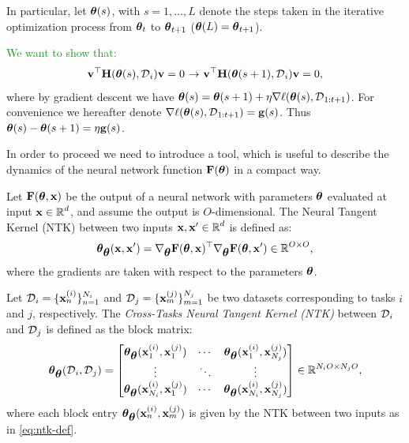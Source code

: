 \documentclass{article} %
\newcommand{\hessian}{\vH}
\begin{document}
In particular, let $\mbox{$\mbox{$\boldsymbol{\theta}$}$}(s)$, with $s=1,\dots,L$ denote the steps taken in the iterative optimization process from $\mbox{$\mbox{$\boldsymbol{\theta}$}$}_{t}$ to $\mbox{$\mbox{$\boldsymbol{\theta}$}$}_{t+1}$ ($\mbox{$\mbox{$\boldsymbol{\theta}$}$}(L) = \mbox{$\mbox{$\boldsymbol{\theta}$}$}_{t+1}$).

\textcolor{forestgreen}{We want to show that:}
\begin{equation}
    \vv^\top \hessian(\vparam(s), \data_i) \vv = 0 \,\,\ra \,\,\vv^\top \hessian(\vparam(s+1), \data_i) \vv = 0,
\end{equation}
where by gradient descent we have $\mbox{$\mbox{$\boldsymbol{\theta}$}$}(s) = \mbox{$\mbox{$\boldsymbol{\theta}$}$}(s+1) + \eta\nabla{\ell({\mbox{$\mbox{$\boldsymbol{\theta}$}$}(s), \mbox{${\cal D}$}_{1:t+1}})}$. For convenience we hereafter denote $\nabla{\ell({\mbox{$\mbox{$\boldsymbol{\theta}$}$}(s), \mbox{${\cal D}$}_{1:t+1}})}  = \mbox{$\mbox{$\mathbf{g}$}$}(s)$. Thus $\mbox{$\mbox{$\boldsymbol{\theta}$}$}(s) - \mbox{$\mbox{$\boldsymbol{\theta}$}$}(s+1) = \eta\mbox{$\mbox{$\mathbf{g}$}$}(s)$.

In order to proceed we need to introduce a tool, which is useful to describe the dynamics of the neural network function $\mbox{$\mbox{$\mathbf{F}$}$}(\mbox{$\mbox{$\boldsymbol{\theta}$}$})$ in a compact way. 

\begin{defn} 
Let $\mbox{$\mbox{$\mathbf{F}$}$}(\mbox{$\mbox{$\boldsymbol{\theta}$}$}, \mbox{$\mbox{$\mathbf{x}$}$})$ be the output of a neural network with parameters $\mbox{$\mbox{$\boldsymbol{\theta}$}$}$ evaluated at input $\mbox{$\mbox{$\mathbf{x}$}$} \in \mbox{$\mathbb{R}$}^d$, and assume the output is $O$-dimensional. The Neural Tangent Kernel (NTK) between two inputs $\mbox{$\mbox{$\mathbf{x}$}$}, \mbox{$\mbox{$\mathbf{x}$}$}' \in \mbox{$\mathbb{R}$}^d$ is defined as: 
\begin{equation} 
\label{eq:ntk-def} 
\vparam_{\vparam}(\vx, \vx') = \grad_{\vparam} \vF(\vparam, \vx)^\top \grad_{\vparam} \vF(\vparam, \vx') \in \real^{O \times O}, \end{equation} 
where the gradients are taken with respect to the parameters $\mbox{$\mbox{$\boldsymbol{\theta}$}$}$. 
\end{defn}


\begin{defn}  
Let $\mbox{${\cal D}$}_i = \{\mbox{$\mbox{$\mathbf{x}$}$}^{(i)}_n\}_{n=1}^{N_i}$ and $\mbox{${\cal D}$}_j = \{\mbox{$\mbox{$\mathbf{x}$}$}^{(j)}_m\}_{m=1}^{N_j}$ be two datasets corresponding to tasks $i$ and $j$, respectively. The \textit{Cross-Tasks Neural Tangent Kernel (NTK)} between $\mbox{${\cal D}$}_i$ and $\mbox{${\cal D}$}_j$ is defined as the block matrix:
\begin{equation}
    \label{eq:cross-task-ntk}
    \vparam_{\vparam}(\data_i, \data_j) = 
    \begin{bmatrix}
        \vparam_{\vparam}(\vx^{(i)}_1, \vx^{(j)}_1) & \cdots & \vparam_{\vparam}(\vx^{(i)}_1, \vx^{(j)}_{N_j}) \\
        \vdots & \ddots & \vdots \\
        \vparam_{\vparam}(\vx^{(i)}_{N_i}, \vx^{(j)}_1) & \cdots & \vparam_{\vparam}(\vx^{(i)}_{N_i}, \vx^{(j)}_{N_j})
    \end{bmatrix}
    \in \real^{N_i O \times N_j O},
\end{equation}
where each block entry $\mbox{$\mbox{$\boldsymbol{\theta}$}$}_{\mbox{$\mbox{$\boldsymbol{\theta}$}$}}(\mbox{$\mbox{$\mathbf{x}$}$}^{(i)}_n, \mbox{$\mbox{$\mathbf{x}$}$}^{(j)}_m)$ is given by the NTK between two inputs as in \cref{eq:ntk-def}.
\end{defn}
\end{document}

